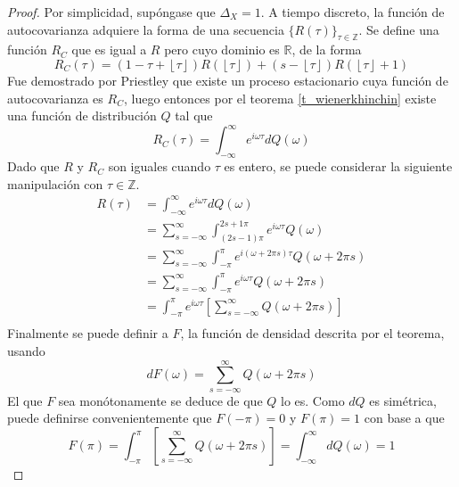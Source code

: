 \documentclass[12pt,letterpaper]{book}
\newcommand{\R}{\mathbb{R}}
\newcommand{\Z}{\mathbb{Z}}
\newcommand{\intR}{\int_{-\infty}^{\infty}}
\newcommand{\intPI}{\int_{-\pi}^{\pi}}
\newcommand{\entero}[1]{\left\lfloor #1 \right\rfloor}
\begin{document}
\begin{proof}
Por simplicidad, supóngase que $\Delta_X=1$. A tiempo discreto, la función de autocovarianza adquiere la forma de una secuencia $\{R(\tau)\}_{\tau\in \Z}$. Se define una función $R_C$ que es igual a $R$ pero cuyo dominio es $\R$, de la forma
\begin{equation}
R_C(\tau) = \left( 1 - \tau + \entero{\tau} \right) R\left( \entero{\tau} \right) +
\left( s - \entero{\tau} \right) R\left( \entero{\tau} +1 \right)
\end{equation}
Fue demostrado por Priestley \cite{Priestley81} que existe un proceso estacionario cuya función de autocovarianza es $R_C$, luego entonces por el teorema \ref{t_wienerkhinchin} existe una función de distribución $Q$ tal que 
\begin{equation}
R_C(\tau) = \intR e^{i \omega \tau} dQ(\omega)
\end{equation}
Dado que $R$ y $R_C$ son iguales cuando $\tau$ es entero, se puede considerar la siguiente manipulación con $\tau \in \Z$.
\begin{align*}
R(\tau) &= 
\intR e^{i \omega \tau} dQ(\omega) \\
&=
\sum_{s = -\infty}^{\infty} \int_{(2s-1)\pi}^{2s+1 \pi} e^{i \omega \tau} Q(\omega) \\
&=
\sum_{s = -\infty}^{\infty} \int_{-\pi}^{\pi} e^{i \left(\omega + 2\pi s \right) \tau} Q(\omega + 2 \pi s) \\
&=
\sum_{s = -\infty}^{\infty} \int_{-\pi}^{\pi} e^{i \omega \tau} Q(\omega + 2 \pi s) \\
&=
\int_{-\pi}^{\pi} e^{i \omega \tau} \left[ \sum_{s = -\infty}^{\infty} Q(\omega + 2 \pi s) \right] \\
\end{align*}
Finalmente se puede definir a $F$, la función de densidad descrita por el teorema, usando
\begin{equation}
dF(\omega) = \sum_{s = -\infty}^{\infty} Q(\omega + 2 \pi s)
\end{equation}
El que $F$ sea monótonamente se deduce de que $Q$ lo es. Como $dQ$ es simétrica, puede definirse convenientemente que $F(-\pi)=0$ y $F(\pi) = 1$ con base a que
\begin{equation}
F(\pi) = \intPI \left[ \sum_{s = -\infty}^{\infty} Q(\omega + 2 \pi s) \right] = \intR dQ(\omega) = 1
\end{equation}
\end{proof}
\end{document}
